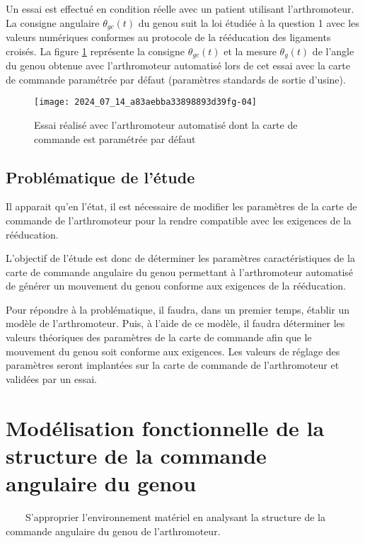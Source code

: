 Un essai est effectué en condition réelle avec un patient utilisant l'arthromoteur. La consigne angulaire $\theta_{g c}(t)$ du genou suit la loi étudiée à la question 1 avec les valeurs numériques conformes au protocole de la rééducation des ligaments croisés. La figure \ref{fig:ccs_mp_2024:fig:06} représente la consigne $\theta_{g c}(t)$ et la mesure $\theta_{g}(t)$ de l'angle du genou obtenue avec l'arthromoteur automatisé lors de cet essai avec la carte de commande paramétrée par défaut (paramètres standards de sortie d'usine).

\begin{figure}[!h]
\centering
\texttt{[image: 2024\_07\_14\_a83aebba33898893d39fg-04]}
\caption{\label{fig:ccs_mp_2024:fig:06}Essai réalisé avec l'arthromoteur automatisé dont la carte de commande est paramétrée par défaut}
\end{figure}



\subsection{Problématique de l'étude}
Il apparait qu'en l'état, il est nécessaire de modifier les paramètres de la carte de commande de l'arthromoteur pour la rendre compatible avec les exigences de la rééducation.

\begin{obj}
L'objectif de l'étude est donc de déterminer les paramètres caractéristiques de la carte de commande angulaire du genou permettant à l'arthromoteur automatisé de générer un mouvement du genou conforme aux exigences de la rééducation.
\end{obj}
Pour répondre à la problématique, il faudra, dans un premier temps, établir un modèle de l'arthromoteur. Puis, à l'aide de ce modèle, il faudra déterminer les valeurs théoriques des paramètres de la carte de commande afin que le mouvement du genou soit conforme aux exigences. Les valeurs de réglage des paramètres seront implantées sur la carte de commande de l'arthromoteur et validées par un essai.

\section{Modélisation fonctionnelle de la structure de la commande angulaire du genou}
 $\qquad$S'approprier l'environnement matériel en analysant la structure de la commande angulaire du genou de l'arthromoteur.


